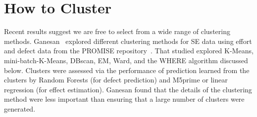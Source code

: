 \documentclass[conference]{IEEEtran}
\begin{document}
	\section{How to Cluster}
	Recent results suggest  we are free to select from a wide range of 
	clustering methods.  Ganesan~\cite{div14} explored 
	different clustering methods for SE data using   effort and defect data from
	the PROMISE repository~\cite{promiserepo}.
	That studied explored
	K-Means, mini-batch-K-Means, DBscan, EM, Ward, and the WHERE algorithm discussed
	below.
	Clusters were assessed via the performance of prediction 
	learned from the clusters by Random Forests (for defect prediction)
	and M5prime or linear regression (for effect estimation).  Ganesan found
	that the details of the clustering method were less important than ensuring that  a large number of clusters were generated.
	
\end{document}
